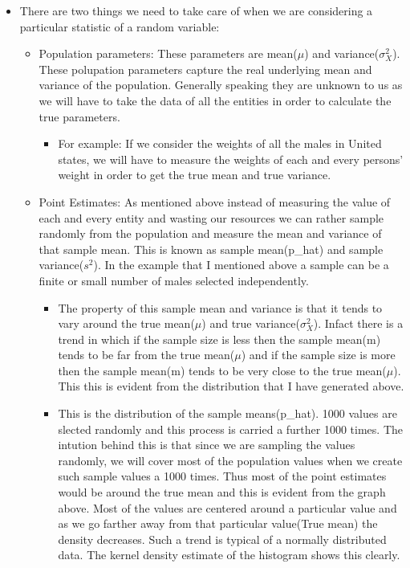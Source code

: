 \documentclass[11pt]{article}
\providecommand{\tightlist}{%
      \setlength{\itemsep}{0pt}\setlength{\parskip}{0pt}}
\begin{document}
    \begin{itemize}
\tightlist
\item
  There are two things we need to take care of when we are considering a
  particular statistic of a random variable:

  \begin{itemize}
  \item
    Population parameters: These parameters are mean(\(\mu\)) and
    variance(\(\sigma_X^2\)). These polupation parameters capture the
    real underlying mean and variance of the population. Generally
    speaking they are unknown to us as we will have to take the data of
    all the entities in order to calculate the true parameters.

    \begin{itemize}
    \tightlist
    \item
      For example: If we consider the weights of all the males in United
      states, we will have to measure the weights of each and every
      persons' weight in order to get the true mean and true variance.
    \end{itemize}
  \item
    Point Estimates: As mentioned above instead of measuring the value
    of each and every entity and wasting our resources we can rather
    sample randomly from the population and measure the mean and
    variance of that sample mean. This is known as sample mean(p\_hat)
    and sample variance(\(s^2\)). In the example that I mentioned above
    a sample can be a finite or small number of males selected
    independently.

    \begin{itemize}
    \tightlist
    \item
      The property of this sample mean and variance is that it tends to
      vary around the true mean(\(\mu\)) and true
      variance(\(\sigma_X^2\)). Infact there is a trend in which if the
      sample size is less then the sample mean(m) tends to be far from
      the true mean(\(\mu\)) and if the sample size is more then the
      sample mean(m) tends to be very close to the true mean(\(\mu\)).
      This this is evident from the distribution that I have generated
      above.
    \item
      This is the distribution of the sample means(p\_hat). 1000 values
      are slected randomly and this process is carried a further 1000
      times. The intution behind this is that since we are sampling the
      values randomly, we will cover most of the population values when
      we create such sample values a 1000 times. Thus most of the point
      estimates would be around the true mean and this is evident from
      the graph above. Most of the values are centered around a
      particular value and as we go farther away from that particular
      value(True mean) the density decreases. Such a trend is typical of
      a normally distributed data. The kernel density estimate of the
      histogram shows this clearly.
    \end{itemize}
  \end{itemize}
\end{itemize}
\end{document}
